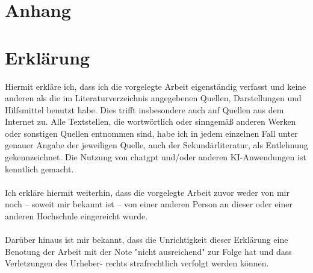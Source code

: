 \documentclass[12pt,a4paper]{article} %
\begin{document}
	\newpage
	\section*{Anhang}
	\section*{Erklärung}
	Hiermit erkläre ich, dass ich die vorgelegte Arbeit eigenständig verfasst und keine anderen als die im Literaturverzeichnis angegebenen Quellen, Darstellungen und Hilfsmittel benutzt habe. Dies trifft insbesondere auch auf Quellen aus dem Internet zu. Alle Textstellen, die wortwörtlich oder sinngemäß anderen Werken oder sonstigen Quellen entnommen sind, habe ich in jedem einzelnen Fall unter genauer Angabe der jeweiligen Quelle, auch der Sekundärliteratur, als Entlehnung gekennzeichnet. Die Nutzung von chatgpt und/oder anderen KI-Anwendungen ist kenntlich gemacht. \\ \\
	Ich erkläre hiermit weiterhin, dass die vorgelegte Arbeit zuvor weder von mir noch -- soweit mir bekannt ist -- von einer anderen Person an dieser oder einer anderen Hochschule eingereicht wurde. \\ \\
	Darüber hinaus ist mir bekannt, dass die Unrichtigkeit dieser Erklärung eine Benotung der Arbeit mit der Note "nicht ausreichend" zur Folge hat und dass Verletzungen des Urheber- rechts strafrechtlich verfolgt werden können.
\end{document}
